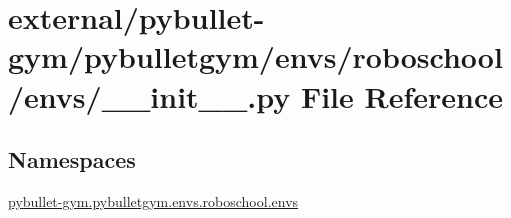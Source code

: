 \hypertarget{external_2pybullet-gym_2pybulletgym_2envs_2roboschool_2envs_2____init_____8py}{}\section{external/pybullet-\/gym/pybulletgym/envs/roboschool/envs/\+\_\+\+\_\+init\+\_\+\+\_\+.py File Reference}
\label{external_2pybullet-gym_2pybulletgym_2envs_2roboschool_2envs_2____init_____8py}
\subsection*{Namespaces}
\begin{DoxyCompactItemize}
\item 
 \hyperlink{namespacepybullet-gym_1_1pybulletgym_1_1envs_1_1roboschool_1_1envs}{pybullet-\/gym.\+pybulletgym.\+envs.\+roboschool.\+envs}
\end{DoxyCompactItemize}
